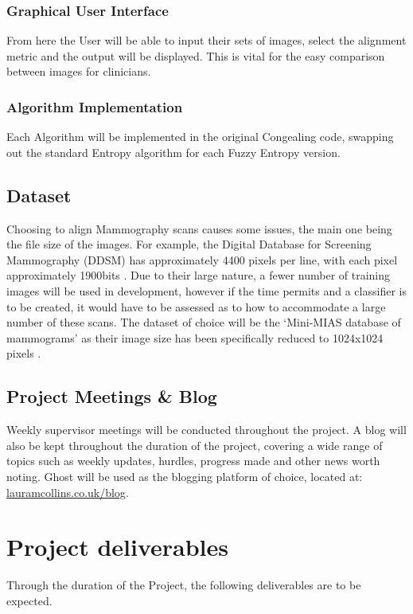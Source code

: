 \documentclass[11pt,fleqn,twoside]{article}
\begin{document}
  \subsubsection{Graphical User Interface}
  From here the User will be able to input their sets of images, select the alignment metric and the output will be displayed. This is vital for the easy comparison between images for clinicians.
  \subsubsection{Algorithm Implementation}
  Each Algorithm will be implemented in the original Congealing code, swapping out the standard Entropy algorithm for each Fuzzy Entropy version.

\subsection{Dataset}
Choosing to align Mammography scans causes some issues, the main one being the file size of the images. For example, the Digital Database for Screening Mammography (DDSM) has approximately 4400 pixels per line, with each pixel approximately 1900bits \cite{ddsm-paper}. Due to their large nature, a fewer number of training images will be used in development, however if the time permits and a classifier is to be created, it would have to be assessed as to how to accommodate a large number of these scans. The dataset of choice will be the `Mini-MIAS database of mammograms' as their image size has been specifically reduced to 1024x1024 pixels \cite{suckling1994mammographic}.

\subsection{Project Meetings \& Blog}
Weekly supervisor meetings will be conducted throughout the project. A blog will also be kept throughout the duration of the project, covering a wide range of topics such as weekly updates, hurdles, progress made and other news worth noting. Ghost will be used as the blogging platform of choice, located at: \url{lauramcollins.co.uk/blog}.

\section{Project deliverables}
Through the duration of the Project, the following deliverables are to be expected.
\end{document}
